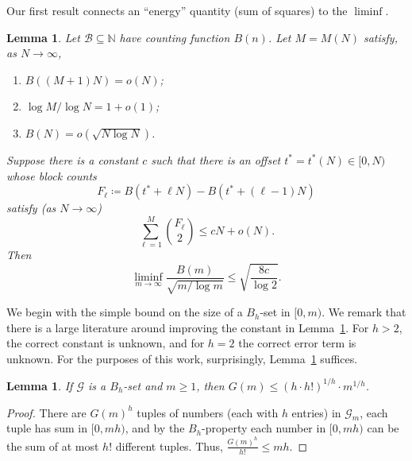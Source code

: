\documentclass[10pt,letterpaper]{article}
\newcommand{\NN}{\ensuremath{\mathbb N}}
\newcommand{\cB}{\mathcal{B}}
\newcommand{\cG}{\mathcal{G}}
\newtheorem{lem}[thm]{Lemma}
\theoremstyle{remark}
\begin{document}
Our first result connects an ``energy'' quantity (sum of squares) to the $\liminf$. 

\begin{lem}\label{lem:energy}
Let $\cB\subseteq\NN$ have counting function $B(n)$.
Let $M=M(N)$ satisfy, as $N\to\infty$,
\begin{enumerate}[label=\textit{(\roman*)},noitemsep]
  \item\label{eng:window} $B((M+1)N)=o(N)$;
  \item\label{eng:ratio} $\log M/\log N =1+o( 1 )$;
  \item\label{eng:head} $B(N)=o(\sqrt{N \log N})$.
\end{enumerate}
Suppose there is a constant $c$ such that there is an
offset $t^\ast=t^\ast(N)\in[0,N)$ whose block counts
  \begin{equation*}\label{hyp:blocks}
    F_\ell \coloneqq B(t^\ast+\ell N)- B(t^\ast+(\ell-1)N)
  \end{equation*}
satisfy (as $N\to\infty$)
  \begin{equation}\label{hyp:energy}
    \sum_{\ell=1}^{M}\binom{F_\ell}{2}\le cN+o(N).
  \end{equation}
Then
  \[\liminf_{m\to\infty}\frac{B(m)}{\sqrt{m/\log m}}\le \sqrt{\frac{8c}{\log 2}}.\]
\end{lem}

We begin with the simple bound on the size of a $B_h$-set in $[0,m)$. We remark that there is a large literature around improving the constant in Lemma~\ref{lem:easy Bh bound}. For $h>2$, the correct constant is unknown, and for $h=2$ the correct error term is unknown. For the purposes of this work, surprisingly, Lemma~\ref{lem:easy Bh bound} suffices.

\begin{lem}\label{lem:easy Bh bound}
  If $\cG$ is a $B_h$-set and $m\ge 1$, then $G(m) \le (h\cdot h!)^{1/h} \cdot m^{1/h}$.
\end{lem}

\begin{proof}
  There are $G(m)^h$ tuples of numbers (each with $h$ entries) in $\cG_m$, each tuple has sum in $[0,mh)$, and by the $B_h$-property each number in $[0,mh)$ can be the sum of at most $h!$ different tuples. Thus,
  \(\frac{G(m)^h}{h!} \le mh.\)
\end{proof}
\end{document}
